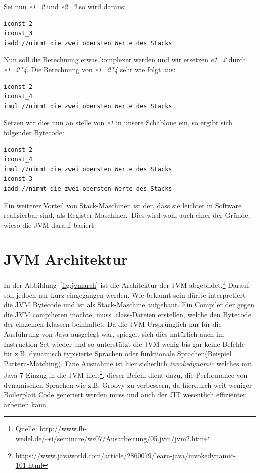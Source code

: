 \documentclass[a4paper, 11pt]{article}
\begin{document}
	Sei nun \textit{e1=2} und \textit{e2=3} so wird daraus:
	\begin{lstlisting}
iconst_2
iconst_3
iadd //nimmt die zwei obersten Werte des Stacks
\end{lstlisting}

	Nun soll die Berechnung etwas komplexer werden und wir ersetzen \textit{e1=2} durch \textit{e1=2*4}.
	Die Berechnung von \textit{e1=2*4} seht wie folgt aus:
	\begin{lstlisting}
iconst_2
iconst_4
imul //nimmt die zwei obersten Werte des Stacks
	\end{lstlisting}
	
	Setzen wir dies nun an stelle von \textit{e1} in unsere Schablone ein, so ergibt sich folgender Bytecode:
	\begin{lstlisting}
iconst_2
iconst_4
imul //nimmt die zwei obersten Werte des Stacks
iconst_3
iadd //nimmt die zwei obersten Werte des Stacks
\end{lstlisting}
	
	Ein weiterer Vorteil von Stack-Maschinen ist der, dass sie leichter in Software realisierbar sind, als Register-Maschinen. Dies wird wohl auch einer der Gründe, wieso die JVM darauf basiert.
	
	
	
  \section{JVM Architektur}
  In der Abbildung~\ref{fig:jvmarch} ist die Architektur der JVM abgebildet.\footnote{Quelle: \url{http://www.fh-wedel.de/~si/seminare/ws07/Ausarbeitung/05.jvm/jvm2.htm}} Darauf soll jedoch nur kurz eingegangen werden. Wie bekannt sein dürfte interpretiert die JVM Bytecode und ist als Stack-Maschine aufgebaut. Ein Compiler der gegen die JVM compilieren möchte, muss .class-Dateien erstellen, welche den Bytecode der einzelnen Klassen beinhaltet. Da die JVM Ursprünglich nur für die Ausführung von Java ausgelegt war, spiegelt sich dies natürlich auch im Instruction-Set wieder und so unterstützt die JVM wenig bis gar keine Befehle für z.B. dynamisch typisierte Sprachen oder funktionale Sprachen(Beispiel Pattern-Matching). Eine Ausnahme ist hier sicherlich \textit{invokedynamic} welches mit Java 7 Einzug in die JVM hielt\footnote{\url{https://www.javaworld.com/article/2860079/learn-java/invokedynamic-101.html}}, dieser Befehl dient dazu, die Performance von dynamischen Sprachen wie z.B. Groovy zu verbessern, da hierdurch weit weniger Boilerplait Code generiert werden muss und auch der JIT wesentlich effizienter arbeiten kann. 
  
\end{document}
